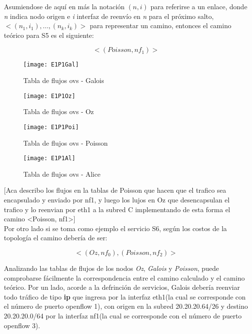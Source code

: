 Asumiendose de aqu\'i en m\'as la notaci\'on $(n, i)$ para referirse a un enlace, donde \textit{n} indica nodo origen e \textit{i} interfaz de reenvío en \textit{n} para el próximo salto, $<(n_1, i_1), \dots, (n_k, i_k)>$ para representar un camino, entonces el camino te\'orico para S5 es el siguiente:

 
$$<(Poisson, nf_1)>$$

\begin{figure}[ht!] 
\centering    
\texttt{[image: E1P1Gal]}
\caption[Tabla de flujos ovs - Galois]{Tabla de flujos ovs - Galois}
\label{fig:CU1P1DumpFlows1}
\end{figure}

\begin{figure}[ht!] 
\centering    
\texttt{[image: E1P1Oz]}
\caption[Tabla de flujos ovs - Oz]{Tabla de flujos ovs - Oz}
\label{fig:CU1P1DumpFlows2}
\end{figure}

\begin{figure}[ht!] 
\centering    
\texttt{[image: E1P1Poi]}
\caption[Tabla de flujos ovs - Poisson]{Tabla de flujos ovs - Poisson}
\label{fig:CU1P1DumpFlows3}
\end{figure}

\begin{figure}[ht!] 
\centering    
\texttt{[image: E1P1Al]}
\caption[Tabla de flujos ovs - Alice]{Tabla de flujos ovs - Alice}
\label{fig:CU1P1DumpFlows4}
\end{figure}

[Aca describo los flujos en la tablas de Poisson que hacen que el trafico sea encapsulado y enviado por nf1, y luego los lujos en Oz que desencapsulan el trafico y lo reenvian por eth1 a la subred C implementando de esta forma el camino <Poisson, nf1>]\\

Por otro lado si se toma como ejemplo el servicio S6, seg\'un los costos de la topolog\'ia el camino deber\'ia de ser:

$$<(Oz, nf_0), (Poisson, nf_2)>$$ 

Analizando las tablas de flujos de los nodos \textit{Oz}, \textit{Galois} y \textit{Poisson}, puede comprobarse fácilmente la correspondencia entre el camino calculado y el camino te\'orico.
Por un lado, acorde a la defrinci\'on de servicios, Galois debería reenviar todo tr\'afico de tipo \textbf{ip} que ingresa por la interfaz eth1(la cual se corresponde con el n\'umero de puerto openflow 1), con origen en la subred 20.20.20.64/26 y destino 20.20.20.0/64 por la interfaz nf1(la cual se corresponde con el n\'umero de puerto openflow 3).

